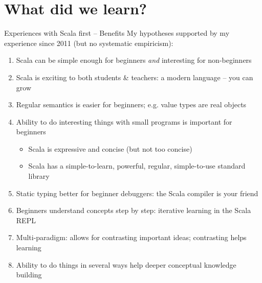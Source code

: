 \documentclass[aspectratio=169]{beamer}
\newcommand{\Section}[1]{\titleimagecolor{red}\section{#1}}
\newenvironment{Slide}[1]%
  {\begin{frame}[environment=Slide]{#1}}
  {\end{frame}}%
\begin{document}




\Section{What did we learn?}


\begin{Slide}{Experiences with Scala first -- Benefits}
  My hypotheses supported by my experience since 2011 (but no systematic empiricism):
  \begin{enumerate}
  \item Scala can be simple enough for beginners \textit{and} interesting for non-beginners %
  \item Scala is exciting to both students \& teachers: a modern language -- you can grow 
  \item Regular semantics is easier for beginners; e.g. value types are real objects
  \item Ability to do interesting things with small programs is important for beginners
  \begin{itemize}
    \item Scala is expressive and concise (but not too concise) 
    \item Scala has a simple-to-learn, powerful, regular, simple-to-use standard library
  \end{itemize}
  \item Static typing better for beginner debuggers: the Scala compiler is your friend  
  \item Beginners understand concepts step by step: iterative learning in the Scala REPL  

  \item Multi-paradigm: allows for contrasting important ideas; contrasting helps learning
  \item Ability to do things in several ways help deeper conceptual knowledge building
  \end{enumerate}  
\end{Slide}
\end{document}
